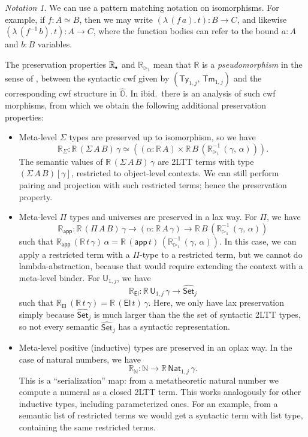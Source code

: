 \documentclass[acmsmall,review]{acmart}
\newcommand{\msf}[1]{\mathsf{#1}}
\newcommand{\mbb}[1]{\mathbb{#1}}
\newcommand{\wh}[1]{\widehat{#1}}
\newcommand{\ext}{\triangleright}
\newcommand{\El}{\msf{El}}
\newcommand{\app}{\msf{app}}
\newcommand{\mbbo}{\mbb{O}}
\renewcommand{\U}{\msf{U}}
\newcommand{\Ty}{\msf{Ty}}
\newcommand{\Tm}{\msf{Tm}}
\newcommand{\Nat}{\msf{Nat}}
\newcommand{\emptycon}{\scaleobj{.75}\bullet}
\newcommand{\Set}{\mathsf{Set}}
\newcommand{\hato}{\bm\hat{\mbbo}}
\newcommand{\re}{\mbb{R}}
\theoremstyle{remark}
\newtheorem{notation}{Notation}
\newcommand{\whset}{\wh{\Set}}
\newcommand{\rexti}{\re_{\ext_1}^{-1}}
\begin{document}
\begin{notation}
  We can use a pattern matching notation on isomorphisms. For example, if $f : A
  \simeq B$, then we may write $(\lambda\,(f\,a).\,t) : B \to C$, and likewise
  $(\lambda\,(f^{-1}\,b).\,t) : A \to C$, where the function bodies can refer to
  the bound $a : A$ and $b : B$ variables.
\end{notation}

The preservation properties $\re_{\emptycon}$ and $\re_{\ext_1}$ mean that $\re$
is a \emph{pseudomorphism} in the sense of \cite{gluing}, between the syntactic
cwf given by $(\Ty_{1,j},\,\Tm_{1,j})$ and the corresponding cwf structure in
$\hato$. In ibid.\ there is an analysis of such cwf morphisms, from which we
obtain the following additional preservation properties:
\begin{itemize}
\item Meta-level $\Sigma$ types are preserved up to isomorphism, so we have
  \[ \re_{\Sigma} : \re\,(\Sigma\,A\,B)\,\gamma
  \simeq ((\alpha : \re\,A) \times \re\,B\,(\rexti\,(\gamma,\,\alpha))). \]
  The semantic values of $\re\,(\Sigma\,A\,B)\,\gamma$
  are 2LTT terms with type $(\Sigma\,A\,B)[\gamma]$, restricted to object-level contexts.
  We can still perform pairing and projection with such restricted terms; hence
  the preservation property.
\item Meta-level $\Pi$ types and universes are preserved in a lax way. For $\Pi$, we have
  \[ \re_{\app} : \re\,(\Pi\,A\,B)\,\gamma \to (\alpha : \re\,A\,\gamma) \to \re\,B\,(\rexti\,(\gamma,\,\alpha))
  \]
  such that $\re_{\app}\,(\re\,t\,\gamma)\,\alpha =
  \re\,(\app\,t)\,(\rexti\,(\gamma,\,\alpha))$. In this case, we can apply a
  restricted term with a $\Pi$-type to a restricted term, but we cannot do
  lambda-abstraction, because that would require extending the context with a
  meta-level binder. For $\U_{1,j}$, we have
  \[
    \re_{\El} : \re\,\U_{1,j}\,\gamma \to \whset_j
  \]
  such that $\re_{\El}\,(\re\,t\,\gamma) = \re\,(\El\,t)\,\gamma$. Here, we only
  have lax preservation simply because $\whset_j$ is much larger than the the
  set of syntactic 2LTT types, so not every semantic $\whset_j$ has a syntactic
  representation.

\item Meta-level positive (inductive) types are preserved in an oplax way. In the case of
  natural numbers, we have
  \[ \re_{\mbb{N}} : \mbb{N} \to \re\,\Nat_{1,j}\,\gamma. \]
  This is a ``serialization'' map: from a metatheoretic natural number we
  compute a numeral as a closed 2LTT term. This works analogously for other
  inductive types, including parameterized ones. For an example, from a semantic
  list of restricted terms we would get a syntactic term with list type,
  containing the same restricted terms.
\end{itemize}
\end{document}
